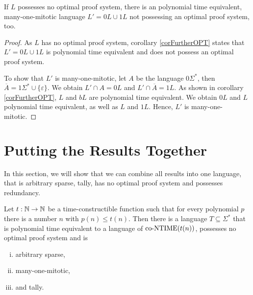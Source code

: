   \begin{theorem} \label{thmMitotic}
    If \(L\) possesses no optimal proof system, there is an polynomial time equivalent, many-one-mitotic language \(L' = 0L \cup 1L\) not possessing an optimal proof system, too.
  \end{theorem}

  \begin{proof}
    As \(L\) has no optimal proof system, corollary \ref{corFurtherOPT} states that \(L' = 0L \cup 1L\) is polynomial time equivalent and does not possess an optimal proof system.

    To show that \(L'\) is many-one-mitotic, let \(A\) be the language \(0\Sigma^*\), then \(\overline{A} = 1\Sigma^* \cup \{ \varepsilon \}\). We obtain \(L' \cap A = 0L\) and \(L' \cap \overline{A} = 1L\). As shown in corollary \ref{corFurtherOPT}, \(L\) and \(bL\) are polynomial time equivalent. We obtain \(0L\) and \(L\) polynomial time equivalent, as well as \(L\) and \(1L\). Hence, \(L'\) is many-one-mitotic.
  \end{proof}
  
  
  \section{Putting the Results Together}
  
  In this section, we will show that we can combine all results into one language, that is arbitrary sparse, tally, has no optimal proof system and possesses redundancy.
  
  \begin{corollary}
    Let \(t:\mathbb{N}\to\mathbb{N}\) be a time-constructible function such that for every polynomial \(p\) there is a number \(n\) with \(p(n) \leq t(n)\). Then there is a language \(T \subseteq \Sigma^*\) that is polynomial time equivalent to a language of \(\text{co-NTIME}(t(n))\), possesses no optimal proof system and is
    \begin{enumerate}[(i)]
     \item arbitrary sparse,
     \item many-one-mitotic,
     \item and tally.
    \end{enumerate}
  \end{corollary}
  
